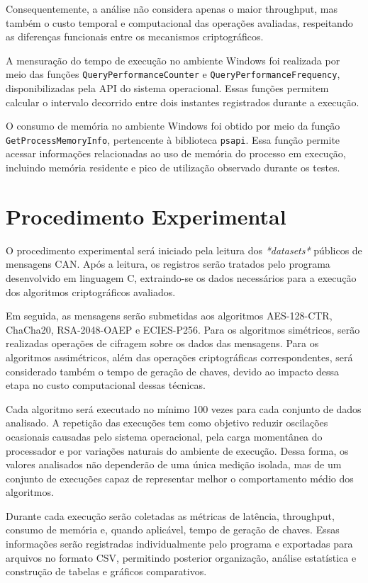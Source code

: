Consequentemente, a análise não considera apenas o maior throughput, mas também o custo temporal e computacional das operações avaliadas, respeitando as diferenças funcionais entre os mecanismos criptográficos.

A mensuração do tempo de execução no ambiente Windows foi realizada por meio das funções \texttt{QueryPerformanceCounter} e \texttt{QueryPerformanceFrequency}, disponibilizadas pela API do sistema operacional. Essas funções permitem calcular o intervalo decorrido entre dois instantes registrados durante a execução.

O consumo de memória no ambiente Windows foi obtido por meio da função \texttt{GetProcessMemoryInfo}, pertencente à biblioteca \texttt{psapi}. Essa função permite acessar informações relacionadas ao uso de memória do processo em execução, incluindo memória residente e pico de utilização observado durante os testes.

\section{Procedimento Experimental}

O procedimento experimental será iniciado pela leitura dos \textit{*datasets*} públicos de mensagens CAN. Após a leitura, os registros serão tratados pelo programa desenvolvido em linguagem C, extraindo-se os dados necessários para a execução dos algoritmos criptográficos avaliados.

Em seguida, as mensagens serão submetidas aos algoritmos AES-128-CTR, ChaCha20, RSA-2048-OAEP e ECIES-P256. Para os algoritmos simétricos, serão realizadas operações de cifragem sobre os dados das mensagens. Para os algoritmos assimétricos, além das operações criptográficas correspondentes, será considerado também o tempo de geração de chaves, devido ao impacto dessa etapa no custo computacional dessas técnicas.

Cada algoritmo será executado no mínimo 100 vezes para cada conjunto de dados analisado. A repetição das execuções tem como objetivo reduzir oscilações ocasionais causadas pelo sistema operacional, pela carga momentânea do processador e por variações naturais do ambiente de execução. Dessa forma, os valores analisados não dependerão de uma única medição isolada, mas de um conjunto de execuções capaz de representar melhor o comportamento médio dos algoritmos.

Durante cada execução serão coletadas as métricas de latência, throughput, consumo de memória e, quando aplicável, tempo de geração de chaves. Essas informações serão registradas individualmente pelo programa e exportadas para arquivos no formato CSV, permitindo posterior organização, análise estatística e construção de tabelas e gráficos comparativos.

